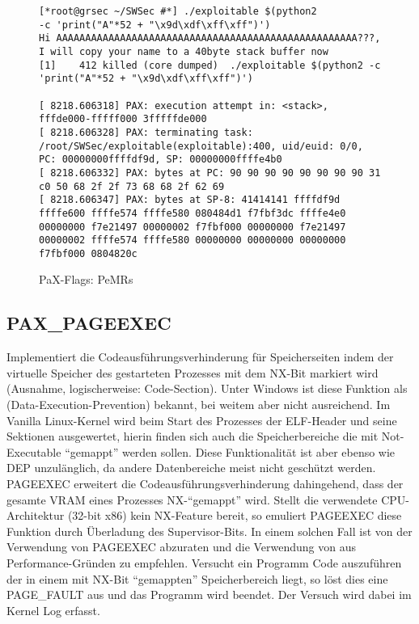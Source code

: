 \begin{figure}[h]
\label{lst:paxflagsan}
\begin{lstlisting}[numbers=none, frame=single, lineskip={-2.5pt}, breaklines=true]
[*root@grsec ~/SWSec #*] ./exploitable $(python2 
-c 'print("A"*52 + "\x9d\xdf\xff\xff")')
Hi AAAAAAAAAAAAAAAAAAAAAAAAAAAAAAAAAAAAAAAAAAAAAAAAAAAA???, I will copy your name to a 40byte stack buffer now
[1]    412 killed (core dumped)  ./exploitable $(python2 -c 'print("A"*52 + "\x9d\xdf\xff\xff")')

[ 8218.606318] PAX: execution attempt in: <stack>, fffde000-fffff000 3fffffde000
[ 8218.606328] PAX: terminating task: /root/SWSec/exploitable(exploitable):400, uid/euid: 0/0, PC: 00000000ffffdf9d, SP: 00000000ffffe4b0
[ 8218.606332] PAX: bytes at PC: 90 90 90 90 90 90 90 90 31 c0 50 68 2f 2f 73 68 68 2f 62 69 
[ 8218.606347] PAX: bytes at SP-8: 41414141 ffffdf9d ffffe600 ffffe574 ffffe580 080484d1 f7fbf3dc ffffe4e0 00000000 f7e21497 00000002 f7fbf000 00000000 f7e21497 00000002 ffffe574 ffffe580 00000000 00000000 00000000 f7fbf000 0804820c
\end{lstlisting}
\caption{PaX-Flags: PeMRs}
\end{figure}

\newpage
\subsection{PAX\_PAGEEXEC}
\label{subsec:PAX_PAGEEXEC}
Implementiert die Codeausführungsverhinderung für Speicherseiten indem der virtuelle Speicher des gestarteten Prozesses mit dem NX-Bit markiert wird (Ausnahme, logischerweise: Code-Section). Unter Windows ist diese Funktion als  (Data-Execution-Prevention) bekannt, bei weitem aber nicht ausreichend. Im Vanilla Linux-Kernel wird beim Start des Prozesses der ELF-Header und seine Sektionen ausgewertet, hierin finden sich auch die Speicherbereiche die mit Not-Executable "`gemappt"' werden sollen. Diese Funktionalität ist aber ebenso wie DEP unzulänglich, da andere Datenbereiche meist nicht geschützt werden. PAGEEXEC erweitert die Codeausführungsverhinderung dahingehend, dass der gesamte VRAM eines Prozesses NX-"`gemappt"' wird. Stellt die verwendete CPU-Architektur (32-bit x86) kein NX-Feature bereit, so emuliert PAGEEXEC diese Funktion durch Überladung des Supervisor-Bits. In einem solchen Fall ist von der Verwendung von PAGEEXEC abzuraten und die Verwendung von  aus Performance-Gründen zu empfehlen.
Versucht ein Programm Code auszuführen der in einem mit NX-Bit "`gemappten"' Speicherbereich liegt, so löst dies eine PAGE\_FAULT aus und das Programm wird beendet. Der Versuch wird dabei im Kernel Log erfasst.

